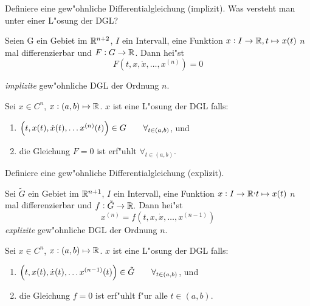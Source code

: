 \documentclass[9pt]{article}
\newcommand{\R}[1]{%
	\ifthenelse{\equal{#1}{}}
		{\mathbb{R}}
		{\mathbb{R}^{#1}}}%
\newenvironment{field}{}{\newpage}
\newif\ifnote
\newenvironment{note}{\notetrue}{\notefalse}
\newcommand{\localtag}{}
\newcommand{\globaltag}{}
\newcommand{\uuid}{}
\newcommand{\tags}[1]{
    \ifnote 
        \renewcommand{\localtag}{#1}
    \else
        \renewcommand{\globaltag}{#1}
    \fi 
    }
\newcommand{\xplain}[1]{\renewcommand{\uuid}{#1}}
\begin{document}

\tags{mathe2::1sem::GDGL}

\begin{note}
	\xplain{UUID}  %
	\tags{definition, 3.1.1, 3.1.2}
	
	\begin{field}  %
		Definiere  eine gew"ohnliche Differentialgleichung (implizit).
		Was versteht man unter einer L"osung der DGL?
	\end{field}  
	
	\begin{field}  %
		Seien G ein Gebiet im $\R{n+2}$, $I$ ein Intervall, eine Funktion $x: I \rightarrow \R{}, 
		t\mapsto x(t)$ $n$ mal differenzierbar und $F: G \rightarrow \R{}$.
		Dann hei"st
		\begin{equation*}
			F(t,x,\dot{x}, \dots, x^{(n)}) = 0
		\end{equation*}
		
		\textit{implizite} gew"ohnliche DGL der Ordnung $n$. 
		
		Sei $x\in C^n$, $x: (a,b) \mapsto \R{}$.  $x$ ist eine L"osung der DGL falls:
		\begin{enumerate}
			\item $\qty(t,x(t), \dot{x}(t), \dots x^{(n)}(t)) \in G \qquad \forall_{t\in (a,b)}$, und
			\item die Gleichung $F=0$ ist erf"uhlt $\forall_{t\in (a,b)}$.
		\end{enumerate}
	\end{field}
	
	\begin{field}  %
		Definiere  eine gew"ohnliche Differentialgleichung (explizit).
	\end{field}  
	
	\begin{field}  %
				Sei $\tilde{G}$ ein Gebiet im $\R{n+1}$,  $I$ ein Intervall, eine Funktion $x: I \rightarrow \R, 
		t\mapsto x(t)$ $n$ mal differenzierbar und $f: \tilde{G} \rightarrow \R{}.$
		Dann hei"st
		\begin{equation*}
			x^{(n)} = f(t,x,\dot{x}, \dots, x^{(n-1)})
		\end{equation*}
		\textit{explizite}  gew"ohnliche DGL der Ordnung $n$.
		
		Sei $x\in C^n$, $x: (a,b) \mapsto \R{}$.  $x$ ist eine L"osung der DGL falls:
		\begin{enumerate}
			\item $\qty(t,x(t), \dot{x}(t), \dots x^{(n-1)}(t)) \in \tilde{G} \qquad \forall_{t\in (a,b)}$, und
			\item die Gleichung $f=0$ ist erf"uhlt f"ur alle $t\in (a,b)$.
		\end{enumerate}
	\end{field}
\end{note}
\end{document}
